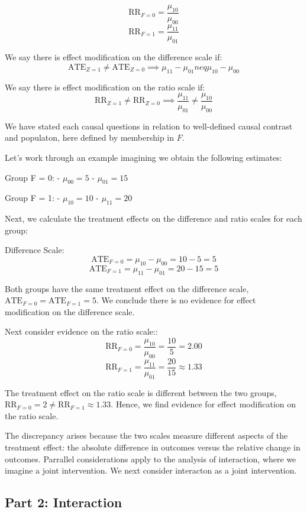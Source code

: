 \documentclass[
  single column]{article}
\begin{document}
\[
\text{RR}_{F = 0} = \frac{\mu_{10}}{\mu_{00}}
\] \[
\text{RR}_{F = 1} = \frac{\mu_{11}}{\mu_{01}}
\]

We say there is effect modification on the difference scale if: \[
\text{ATE}_{Z = 1} \neq \text{ATE}_{Z = 0} \implies \mu_{11} - \mu_{01} neq \mu_{10} - \mu_{00}
\]

We say there is effect modification on the ratio scale if: \[
\text{RR}_{Z = 1} \neq \text{RR}_{Z = 0} \implies \frac{\mu_{11}}{\mu_{01}} \neq \frac{\mu_{10}}{\mu_{00}}
\]

We have stated each causal questions in relation to well-defined causal
contrast and populaton, here defined by membership in \(F\).

Let's work through an example imagining we obtain the following
estimates:

Group F = 0: - \(\mu_{00} = 5\) - \(\mu_{01} = 15\)

Group F = 1: - \(\mu_{10} = 10\) - \(\mu_{11} = 20\)

Next, we calculate the treatment effects on the difference and ratio
scales for each group:

Difference Scale: \[
\text{ATE}_{F = 0} = \mu_{10} - \mu_{00} = 10 - 5 = 5
\] \[
\text{ATE}_{F = 1} = \mu_{11} - \mu_{01} = 20 - 15 = 5
\]

Both groups have the same treatment effect on the difference scale,
\(\text{ATE}_{F = 0} = \text{ATE}_{F = 1} = 5\). We conclude there is no
evidence for effect modification on the difference scale.

Next consider evidence on the ratio scale:: \[
\text{RR}_{F = 0} = \frac{\mu_{10}}{\mu_{00}} = \frac{10}{5} = 2.00
\] \[
\text{RR}_{F = 1} = \frac{\mu_{11}}{\mu_{01}} = \frac{20}{15} \approx 1.33
\]

The treatment effect on the ratio scale is different between the two
groups, \(\text{RR}_{F = 0} = 2 \neq \text{RR}_{F = 1} \approx 1.33\).
Hence, we find evidence for effect modification on the ratio scale.

The discrepancy arises because the two scales measure different aspects
of the treatment effect: the absolute difference in outcomes versus the
relative change in outcomes. Parrallel considerations apply to the
analysis of interaction, where we imagine a joint intervention. We next
consider interacton as a joint intervention.

\subsection{Part 2: Interaction}\label{part-2-interaction}
\end{document}
